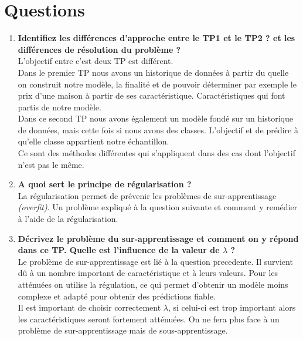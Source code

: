 \clearpage
\section{Questions}


\begin{enumerate}
    \item \textbf{Identifiez les différences d'approche entre le TP1 et le TP2 ? et les différences de résolution du problème ?}\\
    L'objectif entre c'est deux TP est différent. \\
    Dans le premier TP nous avons un historique de données à partir du quelle on construit notre modèle, la finalité et de pouvoir déterminer par exemple le prix d'une maison à partir de ses caractéristique. Caractéristiques qui 
    font partis de notre modèle. \\
    Dans ce second TP nous avons également un modèle fondé sur un historique de données, mais cette fois si nous avons des classes. L'objectif et de prédire à qu'elle classe appartient notre échantillon.\\
    
    Ce sont des méthodes différentes qui s'appliquent dans des cas dont l'objectif n'est pas le même.

    \vspace{0.5cm}
    
    \item \textbf{A quoi sert le principe de régularisation ?} \\
    La régularisation permet de prévenir les problèmes de sur-apprentissage \textit{(overfit)}. Un problème expliqué à la question suivante et comment y remédier à l'aide de la régularisation.
    \vspace{0.5cm}

    \item \textbf{Décrivez le problème du sur-apprentissage et comment on y répond dans ce TP. Quelle est l'influence de la valeur de $\lambda$ ?} \\
    Le problème de sur-apprentissage est lié à la question precedente. Il survient dû à un nombre important de caractéristique et à leurs valeurs. Pour les atténuées on utilise la régulation, ce qui permet d'obtenir un 
    modèle moins complexe et adapté pour obtenir des prédictions fiable. \\
    Il est important de choisir correctement $\lambda$, si celui-ci est trop important alors les caractéristiques seront fortement atténuées. On ne fera plus face à un problème de sur-apprentissage mais de sous-apprentissage.
    \vspace{0.5cm}


\end{enumerate}

